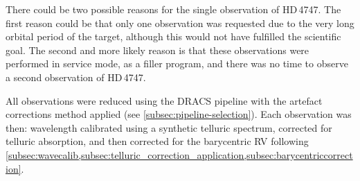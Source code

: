 There could be two possible reasons for the single observation of {HD\,4747}.
The first reason could be that only one observation was requested due to the very long orbital period of the target, although this would not have fulfilled the scientific goal.
The second and more likely reason is that these observations were performed in service mode, as a filler program, and there was no time to observe a second observation of {HD\,4747}.

All observations were reduced using the {DRACS} pipeline with the artefact corrections method applied (see \cref{subsec:pipeline-selection}).
Each observation was then: wavelength calibrated using a synthetic telluric spectrum, corrected for telluric absorption, and then corrected for the barycentric {RV} following  \cref{subsec:wavecalib,subsec:telluric_correction_application,subsec:barycentriccorrection}.

